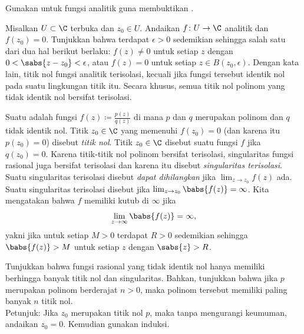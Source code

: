 \begin{exercise} \label{exercise:maxprinciple}
Gunakan  untuk fungsi analitik guna membuktikan .
\end{exercise}

\begin{exercise}
Misalkan $U \subset \C$ terbuka dan $z_0 \in U$.
Andaikan $f \colon U \to \C$ analitik dan $f(z_0) = 0$.  Tunjukkan bahwa
terdapat $\epsilon > 0$ sedemikian sehingga salah satu dari dua hal berikut berlaku:
$f(z) \neq 0$ untuk setiap $z$ dengan $0 < \sabs{z-z_0} < \epsilon$,
atau $f(z) = 0$ untuk setiap $z \in B(z_0,\epsilon)$.
Dengan kata lain, titik nol fungsi analitik terisolasi, kecuali jika fungsi tersebut identik
nol pada suatu lingkungan titik itu.  Secara khusus, semua titik nol polinom yang tidak identik nol bersifat terisolasi.
\end{exercise}

\begin{exnote}
\pagebreak[1]
Suatu \emph{} adalah fungsi
$f(z) \coloneqq \frac{p(z)}{q(z)}$
di mana $p$ dan $q$ merupakan polinom dan $q$ tidak identik nol.
Titik $z_0 \in \C$ yang memenuhi $f(z_0) = 0$ (dan karena itu $p(z_0) = 0$)
disebut \emph{titik nol}.
Titik $z_0 \in \C$ disebut suatu \emph{} fungsi
$f$ jika $q(z_0) = 0$.  Karena titik-titik nol polinom bersifat terisolasi,
singularitas fungsi rasional juga bersifat terisolasi
dan karena itu disebut
\emph{singularitas terisolasi}.
Suatu singularitas terisolasi disebut
\emph{dapat dihilangkan}
jika $\lim_{z \to z_0} f(z)$ ada.
Suatu singularitas terisolasi disebut \emph{} jika 
$\lim_{z \to z_0} \babs{f(z)} = \infty$.
Kita mengatakan bahwa $f$ memiliki kutub di $\infty$ jika
\begin{equation*}
\lim_{z \to \infty} \babs{f(z)} = \infty ,
\end{equation*}
yakni jika untuk setiap $M > 0$ terdapat $R > 0$ sedemikian sehingga
$\babs{f(z)} > M$ untuk setiap $z$ dengan $\sabs{z} > R$.
\end{exnote}

\begin{exercise}
Tunjukkan bahwa fungsi rasional yang tidak identik
nol hanya memiliki berhingga banyak titik nol dan
singularitas.  Bahkan, tunjukkan bahwa jika $p$ merupakan polinom
berderajat $n > 0$, maka polinom tersebut memiliki paling banyak $n$ titik nol.
\\
Petunjuk: Jika $z_0$ merupakan titik nol $p$, maka tanpa mengurangi keumuman, andaikan $z_0 =
0$.  Kemudian gunakan induksi.
\end{exercise}

